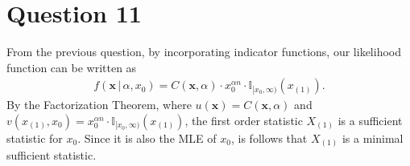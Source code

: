 \documentclass[10pt]{article}
\begin{document}
\section{Question 11} \noindent
From the previous question, by incorporating indicator functions, our likelihood function can be written as 
\begin{align*}
    f(\mathbf{x} \,|\, \alpha, x_0)
    = C(\mathbf{x}, \alpha) \cdot x_0^{\alpha n} \cdot \mathbb{I}_{[x_0, \infty)}(x_{(1)}).
\end{align*}
By the Factorization Theorem, where \(u(\mathbf{x}) = C(\mathbf{x}, \alpha)\) and \(v(x_{(1)}, x_0) = x_0^{\alpha n} \cdot \mathbb{I}_{[x_0, \infty)}(x_{(1)})\),
the first order statistic \(X_{(1)}\) is a sufficient statistic for \(x_0\). Since it is also the MLE of \(x_0\), is follows that \(X_{(1)}\) is a minimal
sufficient statistic.
\end{document}
